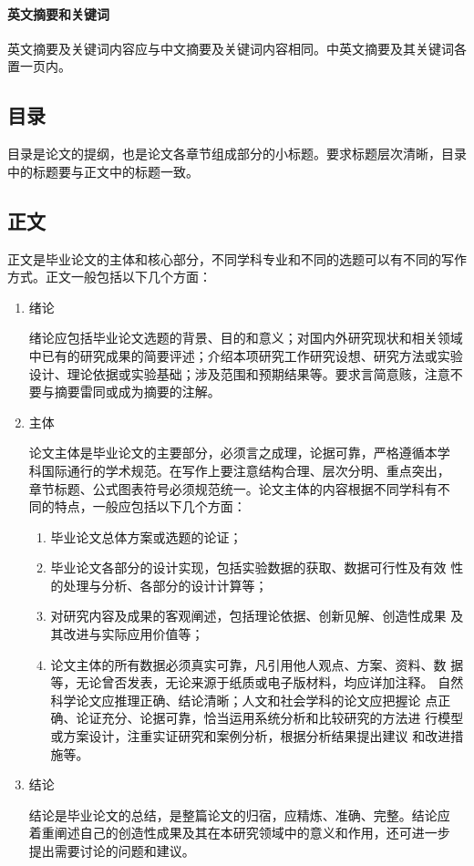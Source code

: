 \paragraph{英文摘要和关键词}

英文摘要及关键词内容应与中文摘要及关键词内容相同。中英文摘要及其关键词各置一页内。

\subsection{目录}

目录是论文的提纲，也是论文各章节组成部分的小标题。要求标题层次清晰，目录中的标题要与正文中的标题一致。

\subsection{正文}

正文是毕业论文的主体和核心部分，不同学科专业和不同的选题可以有不同的写作方式。正文一般包括以下几个方面：

\begin{enumerate}
	\item 绪论\par
	      绪论应包括毕业论文选题的背景、目的和意义；对国内外研究现状和相关领域中已有的研究成果的简要评述；介绍本项研究工作研究设想、研究方法或实验设计、理论依据或实验基础；涉及范围和预期结果等。要求言简意赅，注意不要与摘要雷同或成为摘要的注解。
	\item 主体\par
	      论文主体是毕业论文的主要部分，必须言之成理，论据可靠，严格遵循本学
	      科国际通行的学术规范。在写作上要注意结构合理、层次分明、重点突出，
	      章节标题、公式图表符号必须规范统一。论文主体的内容根据不同学科有不
	      同的特点，一般应包括以下几个方面：
	      \begin{enumerate}
		      \item 毕业论文总体方案或选题的论证；
		      \item 毕业论文各部分的设计实现，包括实验数据的获取、数据可行性及有效
		            性的处理与分析、各部分的设计计算等；
		      \item 对研究内容及成果的客观阐述，包括理论依据、创新见解、创造性成果
		            及其改进与实际应用价值等；
		      \item 论文主体的所有数据必须真实可靠，凡引用他人观点、方案、资料、数
		            据等，无论曾否发表，无论来源于纸质或电子版材料，均应详加注释。
		            自然科学论文应推理正确、结论清晰；人文和社会学科的论文应把握论
		            点正确、论证充分、论据可靠，恰当运用系统分析和比较研究的方法进
		            行模型或方案设计，注重实证研究和案例分析，根据分析结果提出建议
		            和改进措施等。
	      \end{enumerate}
	\item 结论\par
	      结论是毕业论文的总结，是整篇论文的归宿，应精炼、准确、完整。结论应
	      着重阐述自己的创造性成果及其在本研究领域中的意义和作用，还可进一步
	      提出需要讨论的问题和建议。
\end{enumerate}

